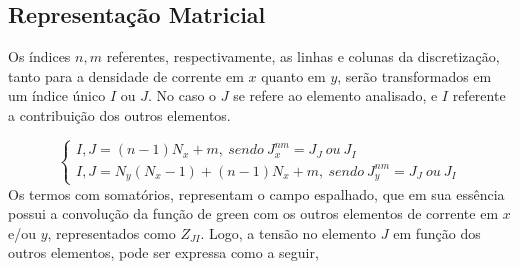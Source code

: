 \documentclass[
	12pt,				%
	openright,			%
	oneside,			%
	a4paper,			%
	english,			%
	brazil				%
	]{abntex2}
\begin{document}
\begin{apendicesenv}
\subsection{Representação Matricial}
Os índices $n,m$ referentes, respectivamente, as linhas e colunas da discretização, tanto para a densidade de corrente em $x$ quanto em $y$, serão transformados em um índice único $I$ ou $J$.  No caso o $J$ se refere ao elemento analisado, e $I$ referente a contribuição dos outros elementos.

\begin{equation}
\begin{cases}
I,J=(n-1) N_x+m ,\ sendo \ J_x^{nm}=J_{J} \ ou \ J_{I}\\
I,J=N_y(N_x-1)+(n-1) N_x+m ,\ sendo \ J_y^{nm}=J_{J} \ ou \ J_{I}
\end{cases}
\end{equation}
Os termos com somatórios, representam o campo espalhado, que em sua essência possui a convolução da função de green com os outros elementos de corrente em $x$ e/ou $y$,  representados como $Z_{JI}$. Logo, a tensão no elemento $J$ em função dos outros elementos, pode ser expressa como a seguir,


\end{apendicesenv}
\end{document}
